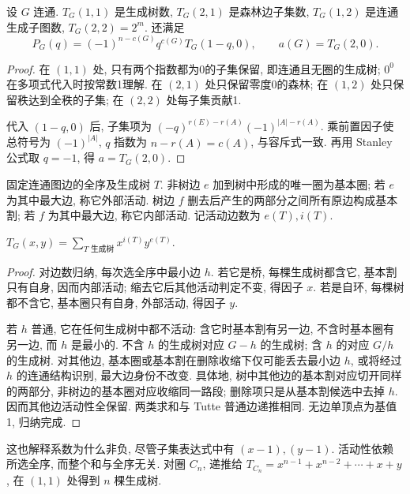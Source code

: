 \begin{proposition}\label{prop:tuttevalues}
设 $G$ 连通. $T_G(1,1)$ 是生成树数, $T_G(2,1)$ 是森林边子集数, $T_G(1,2)$ 是连通生成子图数, $T_G(2,2)=2^m$. 还满足
\[
P_G(q)=(-1)^{n-c(G)}q^{c(G)}T_G(1-q,0),\qquad a(G)=T_G(2,0).
\]
\end{proposition}
\begin{proof}
在 $(1,1)$ 处, 只有两个指数都为0的子集保留, 即连通且无圈的生成树; $0^0$ 在多项式代入时按常数1理解. 在 $(2,1)$ 处只保留零度0的森林; 在 $(1,2)$ 处只保留秩达到全秩的子集; 在 $(2,2)$ 处每子集贡献1.

代入 $(1-q,0)$ 后, 子集项为 $(-q)^{r(E)-r(A)}(-1)^{|A|-r(A)}$. 乘前置因子使总符号为 $(-1)^{|A|}$, $q$ 指数为 $n-r(A)=c(A)$, 与容斥式一致. 再用 Stanley 公式取 $q=-1$, 得 $a=T_G(2,0)$.
\end{proof}
\begin{definition}
固定连通图边的全序及生成树 $T$. 非树边 $e$ 加到树中形成的唯一圈为基本圈; 若 $e$ 为其中最大边, 称它外部活动. 树边 $f$ 删去后产生的两部分之间所有原边构成基本割; 若 $f$ 为其中最大边, 称它内部活动. 记活动边数为 $e(T),i(T)$.
\end{definition}
\begin{theorem}\label{thm:activities}
$T_G(x,y)=\sum_{T\text{ 生成树}}x^{i(T)}y^{e(T)}$.
\end{theorem}
\begin{proof}
对边数归纳, 每次选全序中最小边 $h$. 若它是桥, 每棵生成树都含它, 基本割只有自身, 因而内部活动; 缩去它后其他活动判定不变, 得因子 $x$. 若是自环, 每棵树都不含它, 基本圈只有自身, 外部活动, 得因子 $y$.

若 $h$ 普通, 它在任何生成树中都不活动: 含它时基本割有另一边, 不含时基本圈有另一边, 而 $h$ 是最小的. 不含 $h$ 的生成树对应 $G-h$ 的生成树; 含 $h$ 的对应 $G/h$ 的生成树. 对其他边, 基本圈或基本割在删除收缩下仅可能丢去最小边 $h$, 或将经过 $h$ 的连通结构识别, 最大边身份不改变. 具体地, 树中其他边的基本割对应切开同样的两部分, 非树边的基本圈对应收缩同一路段; 删除项只是从基本割候选中去掉 $h$. 因而其他边活动性全保留. 两类求和与 Tutte 普通边递推相同. 无边单顶点为基值1, 归纳完成.
\end{proof}
这也解释系数为什么非负, 尽管子集表达式中有 $(x-1),(y-1)$. 活动性依赖所选全序, 而整个和与全序无关. 对圈 $C_n$, 递推给 $T_{C_n}=x^{n-1}+x^{n-2}+\cdots+x+y$, 在 $(1,1)$ 处得到 $n$ 棵生成树.

